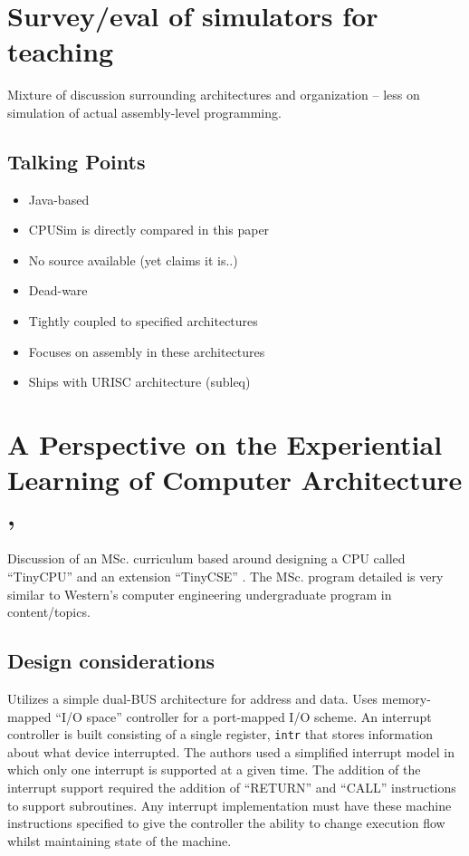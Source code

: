\section{Survey/eval of simulators for teaching \cite{Nikolic2009}}

Mixture of discussion surrounding architectures and organization -- less on simulation of actual assembly-level programming.  


\subsection{Talking Points}

\begin{itemize}
\item Java-based
\item CPUSim is directly compared in this paper
\item No source available (yet claims it is..)
\item Dead-ware
\item Tightly coupled to specified architectures
\item Focuses on assembly in these architectures
\item Ships with URISC architecture (subleq)
\end{itemize}

\section{A Perspective on the Experiential Learning of Computer Architecture \cite{McLoughlin2010}, \cite{Nakamura2013}}

Discussion of an MSc. curriculum based around designing a CPU called ``TinyCPU'' \cite{McLoughlin2010} and an extension ``TinyCSE'' \cite{Nakamura2013}. The MSc. program detailed is very similar to Western's computer engineering undergraduate program in content/topics. 

\subsection{Design considerations}

Utilizes a simple dual-BUS architecture for address and data. Uses memory-mapped ``I/O space'' controller for a port-mapped I/O scheme. An interrupt controller is built consisting of a single register, \verb|intr| that stores information about what device interrupted. The authors used a simplified interrupt model in which only one interrupt is supported at a given time. The addition of the interrupt support required the addition of ``RETURN'' and ``CALL'' instructions to support subroutines. Any interrupt implementation must have these machine instructions specified to give the controller the ability to change execution flow whilst maintaining state of the machine. 


